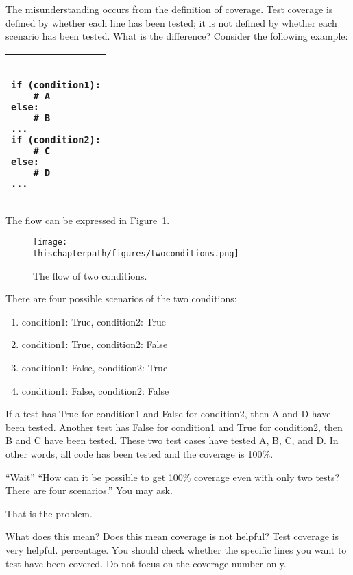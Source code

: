 {The misunderstanding occurs from the definition of coverage.  Test
coverage is defined by whether each line has been tested; it is not
defined by whether each scenario has been tested. What is the
difference? Consider the following example:

\vspace{0.2in}

\noindent
\begin{tabular}{|p{5in}|}\hline
\begin{verbatim}

if (condition1):
    # A
else:
    # B
...
if (condition2):
    # C
else:
    # D
...
\end{verbatim}
\\ \hline
\end{tabular}
\vspace{0.2in}

The flow can be expressed in Figure~\ref{fig:twoconditions}.

\begin{figure}[h] \centering
{\texttt{[image: \\thischapterpath/figures/twoconditions.png]}}
\caption{The flow of two conditions.}
\label{fig:twoconditions}
\end{figure}

There are four possible scenarios of the two conditions:

\begin{enumerate}
\item condition1: True, condition2: True
\item condition1: True, condition2: False
\item condition1: False, condition2: True
\item condition1: False, condition2: False
\end{enumerate}

If a test has True for condition1 and False for condition2, then A and
D have been tested. Another test has False for condition1 and True for
condition2, then B and C have been tested.  These two test cases have
tested A, B, C, and D. In other words, all code has been tested and
the coverage is 100\%.

``Wait'' ``How can it be possible to get 100\% coverage even with only
two tests? There are four scenarios.'' You may ask.

That is the problem.

What does this mean? Does this mean coverage is not helpful? Test
coverage is very helpful.  percentage. You should check whether the
specific lines you want to test have been covered.  Do not focus on
the coverage number only.


}
